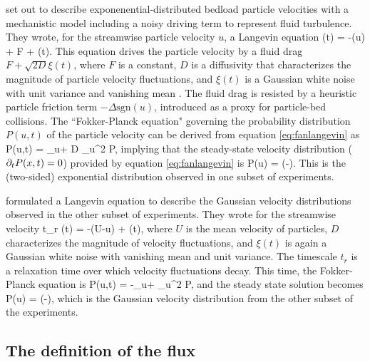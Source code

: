 \citet{Fan2014} set out to describe exponenential-distributed bedload particle velocities with a mechanistic model including a noisy driving term to represent fluid turbulence.
They wrote, for the streamwise particle velocity $u$, a Langevin equation
\be {}(t) = -\Delta {}(u) + F + \xi(t). \label{eq:fanlangevin}\ee
This equation drives the particle velocity by a fluid drag $F + \sqrt{2D} \xi(t)$, where $F$ is a constant, $D$ is a diffusivity that characterizes the magnitude of particle velocity fluctuations, and $\xi(t)$ is a Gaussian white noise with unit variance and vanishing mean \citep{Gardiner1983}. The fluid drag is resisted by a heuristic particle friction term $-\Delta \text{sgn}(u)$, introduced as a proxy for particle-bed collisions. The ``Fokker-Planck equation" governing the probability distribution $P(u,t)$ of the particle velocity can be derived from equation \ref{eq:fanlangevin} as \citep{Risken1984,VanKampen2007} 
\be \pt P(u,t) = \Delta\partial_u + D \partial_u^2 P,\ee
implying that the steady-state velocity distribution ($\partial_t P(x,t) = 0$) provided by equation \ref{eq:fanlangevin} is
\be P(u) = \exp\Big(-\Big).\ee
This is the (two-sided) exponential distribution observed in one subset of experiments.

\citet{Ancey2014} formulated a Langevin equation to describe the Gaussian velocity distributions observed in the other subset of experiments. They wrote for the streamwise velocity 
\be t_r (t) = -(U-u) + \xi(t),\ee
where $U$ is the mean velocity of particles, $D$ characterizes the magnitude of velocity fluctuations, and $\xi(t)$ is again a Gaussian white noise with vanishing mean and unit variance. The timescale $t_r$ is a relaxation time over which velocity fluctuations decay. This time, the Fokker-Planck equation is
\be \pt P(u,t) = -\partial_u +  \partial_u^2 P,\ee 
and the steady state solution becomes
\be P(u) =  \exp\Big(-\Big), \ee
which is the Gaussian velocity distribution from the other subset of the experiments.


\subsection{The definition of the flux}


